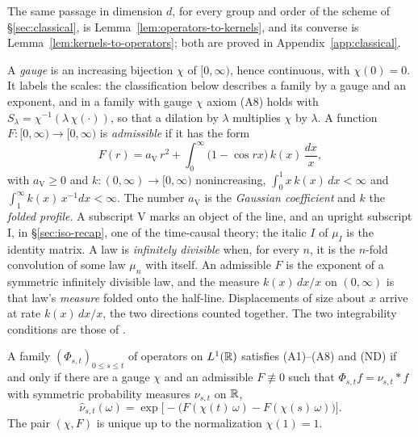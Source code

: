 The same passage in dimension $d$, for every group and order of the scheme of
\S\ref{sec:classical}, is Lemma~\ref{lem:operators-to-kernels}, and its converse is
Lemma~\ref{lem:kernels-to-operators}; both are proved in Appendix~\ref{app:classical}.

A \emph{gauge} is an increasing bijection $\chi$ of $[0,\infty)$, hence continuous, with
$\chi(0) = 0$. It labels the scales: the classification below describes a family by a gauge
and an exponent, and in a family with gauge $\chi$ axiom (A8) holds with
$S_\lambda = \chi^{-1}(\lambda\,\chi(\cdot))$, so that a dilation by $\lambda$ multiplies $\chi$ by
$\lambda$. A function
$F : [0,\infty) \to [0,\infty)$ is \emph{admissible} if it has the form 
\begin{equation}\label{eq:admissible-line}
  F(r) = a_{\mathrm V}\,r^2 + \int_0^\infty \bigl(1 - \cos rx\bigr)\,k(x)\,\frac{dx}{x},
\end{equation}
with $a_{\mathrm V} \ge 0$ and $k : (0,\infty) \to [0,\infty)$ nonincreasing,
$\int_0^1 x\,k(x)\,dx < \infty$ and $\int_1^\infty k(x)\,x^{-1}dx < \infty$. The number
$a_{\mathrm V}$ is the \emph{Gaussian coefficient} and $k$ the \emph{folded profile}. A subscript
$\mathrm V$ marks an object of the line, and an upright subscript $\mathrm I$, in
\S\ref{sec:iso-recap}, one of the time-causal theory; the italic $I$ of $\mu_I$ is the identity
matrix. A law is
\emph{infinitely divisible} when, for every $n$, it is the $n$-fold convolution of some law $\mu_n$
with itself. An admissible $F$ is the exponent of a symmetric infinitely divisible law, and the
measure $k(x)\,dx/x$ on $(0,\infty)$ is that law's \emph{\Levy{} measure} folded onto the half-line.
Displacements of size about $x$ arrive at rate $k(x)\,dx/x$, the two directions counted together. The two integrability conditions are
those of .

\begin{theorem}\label{thm:line-classification}
A family $(\Phi_{s,t})_{0 \le s \le t}$ of operators on $L^1(\mathbb{R})$ satisfies (A1)--(A8) and (ND)
if and only if there are a gauge $\chi$ and an admissible $F \not\equiv 0$ such that
$\Phi_{s,t}f = \nu_{s,t} * f$ with symmetric probability measures $\nu_{s,t}$ on $\mathbb{R}$,
\[
  \widehat\nu_{s,t}(\omega) = \exp\bigl[-\bigl(F(\chi(t)\,\omega) - F(\chi(s)\,\omega)\bigr)\bigr] .
\]
The pair $(\chi, F)$ is unique up to the normalization $\chi(1) = 1$.
\end{theorem}

